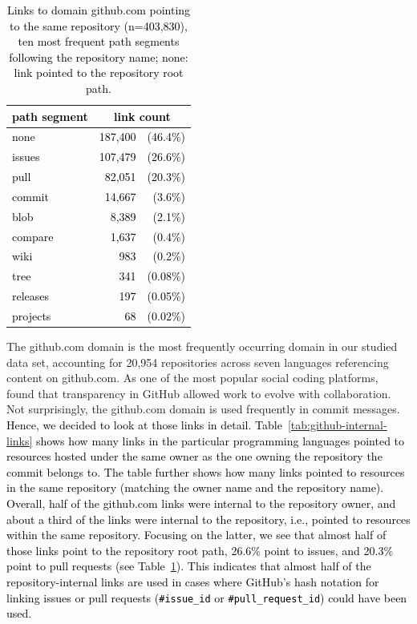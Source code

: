 \documentclass[smallextended]{svjour3}       %
\newcommand{\fix}[1]{\textcolor{black}{#1}}
\newcommand{\minor}[1]{\textcolor{black}{#1}}
\begin{document}
\begin{table}[t]
\caption{\fix{Links to domain \textsf{github.com} pointing to the same repository (n=403,830), ten most frequent path segments following the repository name; none: link pointed to the repository root path.}}
\label{tab:github-internal-links-same-repo} 
\centering
\fix{
\begin{tabular}{lrr}
\toprule
\textbf{path segment} & \multicolumn{2}{c}{\textbf{link count}} \\
\midrule
none & 187,400 & (46.4\%) \\
issues & 107,479 & (26.6\%) \\
pull & 82,051 & (20.3\%) \\
commit & 14,667 & (3.6\%) \\
blob & 8,389 & (2.1\%) \\
compare & 1,637 & (0.4\%) \\
wiki & 983 & (0.2\%) \\
tree & 341 & (0.08\%) \\
releases & 197 & (0.05\%) \\
projects & 68 & (0.02\%) \\
\bottomrule
\end{tabular}
}
\end{table}

The \textsf{github.com} domain is the most frequently occurring domain in our studied data set, accounting for 20,954 repositories across seven languages referencing content on \textsf{github.com}. As one of the most popular social coding platforms,~\cite{dabbish2012social} found that transparency in GitHub allowed work to evolve with collaboration. Not surprisingly, the \textsf{github.com} domain is used frequently in commit messages.
\fix{Hence, we decided to look at those links in detail. Table~\ref{tab:github-internal-links} shows how many links in the particular programming languages pointed to resources hosted under the same owner as the one owning the repository the commit belongs to. The table further shows how many links pointed to resources in the same repository \minor{(matching the owner name and the repository name)}. Overall, half of the \textsf{github.com} links were internal to the repository owner, and about a third of the links were internal to the repository, i.e., pointed to resources within the same repository. Focusing on the latter, we see that almost half of those links point to the repository root path, 26.6\% point to issues, and 20.3\% point to pull requests (see Table~\ref{tab:github-internal-links-same-repo}). This indicates that almost half of the repository-internal links are used in cases where GitHub's hash notation for linking issues or pull requests (\lstinline{#issue_id} or \lstinline{#pull_request_id}) could have been used.}
\end{document}
